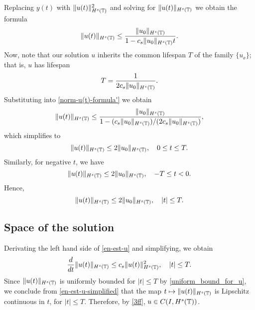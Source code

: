 %
%
Replacing $y(t)$ with   $\|u(t)\|_{H^s(\mathbb{T})}^2$  and solving for  $\|u(t)\|_{H^s(\mathbb{T})}$
we obtain the formula
%
\begin{equation} 
\label{norm-u(t)-formula'}
\|u(t)\|_{H^s(\mathbb{T})}
\le
\frac{\|u_0\|_{H^s(\mathbb{T})}}{1-c_s\|u_0\|_{H^s(\mathbb{T})} t}.
\end{equation}
%
Now, note that our solution $u$ inherits the common lifespan $T$ of the family
$\{u_\ee\}$; that is, $u$ has lifespan
\begin{equation*}
T
=
\frac{1}{2 c_s \|u_0\|_{H^s(\mathbb{T})}}.
\end{equation*}
Substituting into \eqref{norm-u(t)-formula'} we obtain	
%
\begin{equation*} 
\label{u(t)-u(0)-bound'}
\|u(t)\|_{H^s(\mathbb{T})}
\le
\frac{\|u_0\|_{H^s(\mathbb{T})}}{1-(c_s\|u_0\|_{H^s(\mathbb{T})})/(2 c_s \|u_0\|_{H^s(\mathbb{T})})},
\end{equation*}
%
which simplifies to 
%
\begin{equation*}
\|u(t)\|_{H^s(\mathbb{T})}
\le
2 \|u_0\|_{H^s(\mathbb{T})},
\quad 
0\le t \le T.
\end{equation*}
Similarly, for negative $t$, we have
\begin{equation*}
\|u(t)\|_{H^s(\mathbb{T})}
\le
2 \|u_0\|_{H^s(\mathbb{T})},
\quad 
-T \le t < 0.
\end{equation*}
Hence,
\begin{equation}
\label{uniform_bound_for_u}
\|u(t)\|_{H^s(\mathbb{T})}
\le
2 \|u_0\|_{H^s(\mathbb{T})},
\quad 
|t| \le T.
\end{equation}
%
\subsection{Space of the solution}
Derivating the left hand side of \eqref{en-est-u} and simplifying, we obtain
\begin{equation}
\label{en-est-u-simplified}
\frac{d}{dt} \|u(t)\|_{H^s(\mathbb{T})} \le c_s \|u(t)\|_{H^s(\mathbb{T})}^2, \quad |t| \le T.
\end{equation}
Since $\|u(t)\|_{H^s(\mathbb{T})}$
is uniformly bounded for $|t| \le T$ by
\eqref{uniform_bound_for_u}, we conclude from
\eqref{en-est-u-simplified} that the map $t \mapsto
\|u(t)\|_{H^s(\mathbb{T})}$ is Lipschitz continuous in $t$, for $|t| \le T$.
Therefore, by \eqref{3ff}, $u \in C(I, H^s(\mathbb{T}))$. 
%
%
%
%
%
